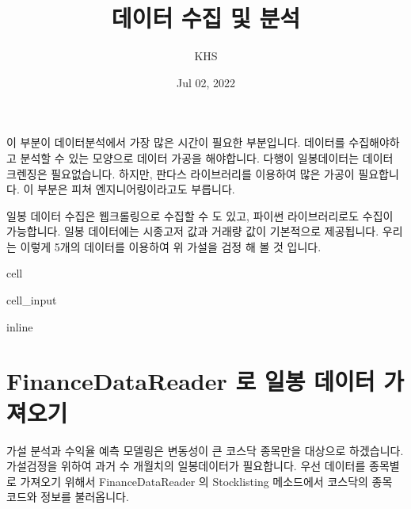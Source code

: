 \documentclass[letterpaper,10pt,english]{jupyterBook}
\title{데이터 수집 및 분석}
\date{Jul 02, 2022}
\author{KHS}
\begin{document}
\pagestyle{empty}
\sphinxmaketitle
\pagestyle{plain}
\sphinxtableofcontents
\pagestyle{normal}
\label{\detokenize{chapter4/4.4.0_Data_Collection::doc}}


\sphinxAtStartPar
이 부분이 데이터분석에서 가장 많은 시간이 필요한 부분입니다. 데이터를 수집해야하고 분석할 수 있는 모양으로 데이터 가공을 해야합니다. 다행이 일봉데이터는 데이터 크렌징은 필요없습니다. 하지만, 판다스 라이브러리를 이용하여 많은 가공이 필요합니다. 이 부분은 피쳐 엔지니어링이라고도 부릅니다.

\sphinxAtStartPar
일봉 데이터 수집은 웹크롤링으로 수집할 수 도 있고, 파이썬 라이브러리로도 수집이 가능합니다. 일봉 데이터에는 시종고저 값과 거래량 값이 기본적으로 제공됩니다. 우리는 이렇게 5개의 데이터를 이용하여 위 가설을 검정 해 볼 것 입니다.

\begin{sphinxuseclass}{cell}\begin{sphinxVerbatimInput}

\begin{sphinxuseclass}{cell_input}
\begin{sphinxVerbatim}[commandchars=\\\{\}]
   
   
 inline
 
    
   
   
 
 

  
\end{sphinxVerbatim}

\end{sphinxuseclass}\end{sphinxVerbatimInput}

\end{sphinxuseclass}

\part{FinanceDataReader 로 일봉 데이터 가져오기}
\label{\detokenize{chapter4/4.4.1_Data_Collection:financedatareader}}\label{\detokenize{chapter4/4.4.1_Data_Collection::doc}}
\sphinxAtStartPar
가설 분석과 수익율 예측 모델링은 변동성이 큰 코스닥 종목만을 대상으로 하겠습니다.
가설검정을 위하여 과거 수 개월치의 일봉데이터가 필요합니다. 우선 데이터를 종목별로 가져오기 위해서 FinanceDataReader 의 Stocklisting 메소드에서 코스닥의 종목 코드와 정보를 불러옵니다.
\end{document}
